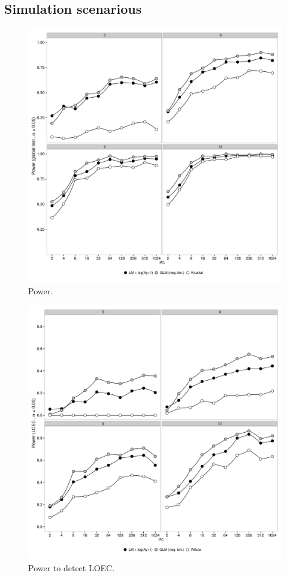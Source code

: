 \documentclass{scrartcl}\usepackage[]{graphicx}\usepackage[]{color}
\begin{document}
\subsection{Simulation scenarious}

\begin{figure}
  \includegraphics[width = \textwidth]{p2.pdf}
  \caption{Power.}
  \label{fig:p2}
\end{figure}

\begin{figure}
  \includegraphics[width = \textwidth]{p3.pdf}
  \caption{Power to detect LOEC.}
  \label{fig:p3}
\end{figure}
\end{document}
